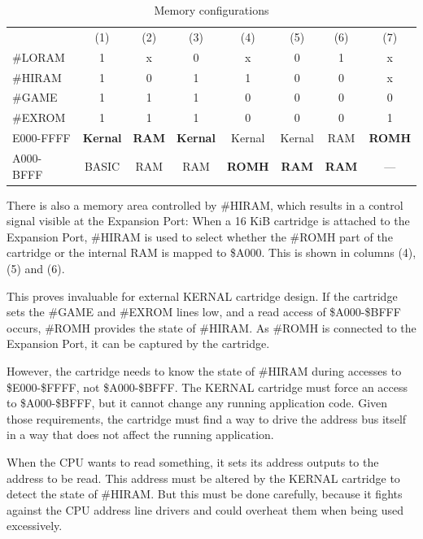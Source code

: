 \documentclass[a4paper,oneside]{memoir}
\begin{document}
\begin{table}
    \centering
    \begin{tabularx}{\textwidth}{lccccccc}

        \toprule
                & (1) & (2) & (3) & (4) & (5) & (6) & (7) \\[3pt]
        \#LORAM & 1 & x & 0 & x & 0 & 1 & x \\[3pt]
        \#HIRAM & 1 & 0 & 1 & 1 & 0 & 0 & x \\[3pt]
        \#GAME  & 1 & 1 & 1 & 0 & 0 & 0 & 0 \\[3pt]
        \#EXROM & 1 & 1 & 1 & 0 & 0 & 0 & 1 \\[3pt]
        \midrule
        E000-FFFF & \textbf{Kernal} & \textbf{RAM} & \textbf{Kernal} &
          Kernal         & Kernal        & RAM           & \textbf{ROMH} \\[3pt]
        A000-BFFF & BASIC            & RAM           & RAM              &
          \textbf{ROMH} & \textbf{RAM} & \textbf{RAM} & --- \\[3pt]
        \bottomrule
    \end{tabularx}
    \caption{Memory configurations}
    \label{tab:mem-configs}
\end{table}

There is also a memory area controlled by \#HIRAM, which results in a
control signal visible at the Expansion Port: When a 16 KiB
cartridge is attached to the Expansion Port, \#HIRAM is used to
select whether the \#ROMH part of the cartridge or the internal RAM
is mapped to \$A000. This is shown in columns (4), (5) and (6).

This proves invaluable for external KERNAL cartridge design. If the
cartridge sets the \#GAME and \#EXROM lines low, and a read
access of \$A000-\$BFFF occurs, \#ROMH provides the state of
\#HIRAM. As \#ROMH is connected to the Expansion Port, it can be
captured by the cartridge.

However, the cartridge needs to know the state of \#HIRAM during 
accesses to \$E000-\$FFFF, not \$A000-\$BFFF. The KERNAL
cartridge must force an access to \$A000-\$BFFF, but it cannot
change any running application code. Given those requirements, the
cartridge must find a way to drive the address bus itself in a way
that does not affect the running application.

When the CPU wants to read something, it sets its address outputs to
the address to be read. This address must be altered by the KERNAL 
cartridge to detect the state of \#HIRAM. But this must be done 
carefully, because it fights against the CPU address
line drivers and could overheat them when being used excessively.
\end{document}
